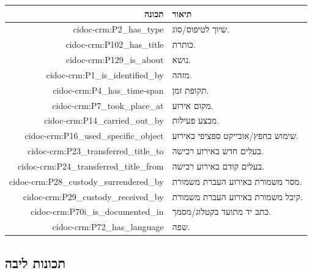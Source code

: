 \documentclass[12pt,a4paper]{article}
\begin{document}
\begin{longtable}{|r|p{8cm}|}
\hline
\textbf{תכונה} & \textbf{תיאור} \\
\hline
\endhead

cidoc-crm:P2\_has\_type & שיוך לטיפוס/סוג.\\
\hline
cidoc-crm:P102\_has\_title & כותרת.\\
\hline
cidoc-crm:P129\_is\_about & נושא.\\
\hline
cidoc-crm:P1\_is\_identified\_by & מזהה.\\
\hline
cidoc-crm:P4\_has\_time-span & תקופת זמן.\\
\hline
cidoc-crm:P7\_took\_place\_at & מקום אירוע.\\
\hline
cidoc-crm:P14\_carried\_out\_by & מבצע פעילות.\\
\hline
cidoc-crm:P16\_used\_specific\_object & שימוש בחפץ/אובייקט ספציפי באירוע.\\
\hline
cidoc-crm:P23\_transferred\_title\_to & בעלים חדש באירוע רכישה.\\
\hline
cidoc-crm:P24\_transferred\_title\_from & בעלים קודם באירוע רכישה.\\
\hline
cidoc-crm:P28\_custody\_surrendered\_by & מסר משמורת באירוע העברת משמורת.\\
\hline
cidoc-crm:P29\_custody\_received\_by & קיבל משמורת באירוע העברת משמורת.\\
\hline
cidoc-crm:P70i\_is\_documented\_in & כתב יד מתועד בקטלוג/מסמך.\\
\hline
cidoc-crm:P72\_has\_language & שפה.\\
\hline
\end{longtable}

\subsection{תכונות ליבה}
\end{document}
